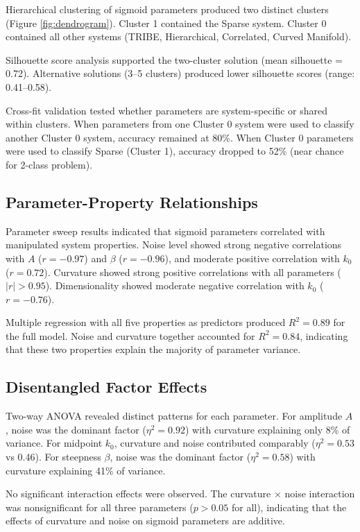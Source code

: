 Hierarchical clustering of sigmoid parameters produced two distinct clusters (Figure \ref{fig:dendrogram}). Cluster 1 contained the Sparse system. Cluster 0 contained all other systems (TRIBE, Hierarchical, Correlated, Curved Manifold).

Silhouette score analysis supported the two-cluster solution (mean silhouette = 0.72). Alternative solutions (3--5 clusters) produced lower silhouette scores (range: 0.41--0.58).

Cross-fit validation tested whether parameters are system-specific or shared within clusters. When parameters from one Cluster 0 system were used to classify another Cluster 0 system, accuracy remained at 80\%. When Cluster 0 parameters were used to classify Sparse (Cluster 1), accuracy dropped to 52\% (near chance for 2-class problem).

\subsection{Parameter-Property Relationships}

Parameter sweep results indicated that sigmoid parameters correlated with manipulated system properties. Noise level showed strong negative correlations with $A$ ($r = -0.97$) and $\beta$ ($r = -0.96$), and moderate positive correlation with $k_0$ ($r = 0.72$). Curvature showed strong positive correlations with all parameters ($|r| > 0.95$). Dimensionality showed moderate negative correlation with $k_0$ ($r = -0.76$).

Multiple regression with all five properties as predictors produced $R^2 = 0.89$ for the full model. Noise and curvature together accounted for $R^2 = 0.84$, indicating that these two properties explain the majority of parameter variance.

\subsection{Disentangled Factor Effects}

Two-way ANOVA revealed distinct patterns for each parameter. For amplitude $A$, noise was the dominant factor ($\eta^2 = 0.92$) with curvature explaining only 8\% of variance. For midpoint $k_0$, curvature and noise contributed comparably ($\eta^2 = 0.53$ vs 0.46). For steepness $\beta$, noise was the dominant factor ($\eta^2 = 0.58$) with curvature explaining 41\% of variance.

No significant interaction effects were observed. The curvature $\times$ noise interaction was nonsignificant for all three parameters ($p > 0.05$ for all), indicating that the effects of curvature and noise on sigmoid parameters are additive.

